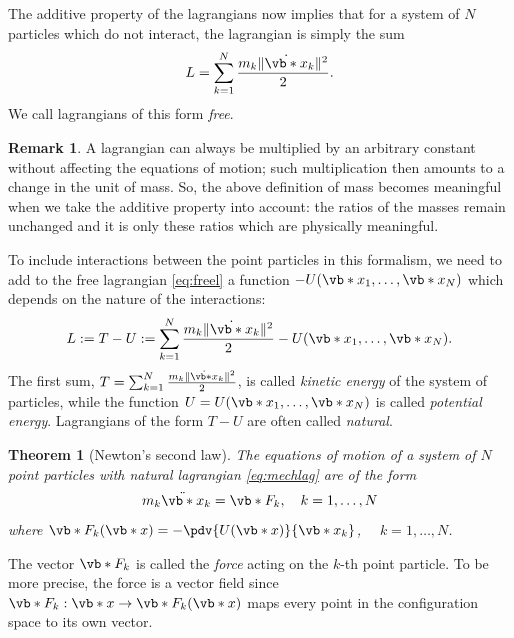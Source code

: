\documentclass[english,fontsize=11pt,paper=b5]{scrbook}
\numberwithin{equation}{chapter}
\newtheorem{theorem}{Theorem}[chapter]
\theoremstyle{definition}
\newtheorem{remark}{Remark}[chapter]
\newcommand{\emphidx}[1]{\index{#1}\emph{#1}}
\begin{document}
    The additive property of the lagrangians now implies that for a system of $N$ particles which do not interact, the lagrangian is simply the sum
    \begin{equation}\label{eq:freel}
      L = \sum_{k=1}^N \frac{m_k \|\dot{\vb*{x}}_k\|^2}{2}.
    \end{equation}
    We call lagrangians of this form \emph{free}.

    \begin{remark}
      A lagrangian can always be multiplied by an arbitrary constant without affecting the equations of motion;
      such multiplication then amounts to a change in the unit of mass.
      So, the above definition of mass becomes meaningful when we take the additive property into account:
      the ratios of the masses remain unchanged and it is only these ratios which are physically meaningful.
    \end{remark}

    To include interactions between the point particles in this formalism, we need to add to the free lagrangian \eqref{eq:freel} a function $-U(\vb*{x}_1, \ldots, \vb*{x}_N)$ which depends on the nature of the interactions:
    \begin{equation}\label{eq:mechlag}
      L := T-U := \sum_{k=1}^N \frac{m_k \|\dot{\vb*{x}}_k\|^2}{2} -U(\vb*{x}_1, \ldots, \vb*{x}_N).
    \end{equation}
    The first sum, $T = \sum_{k=1}^N \frac{m_k \|\dot{\vb*{x}}_k\|^2}{2}$, is called \emph{kinetic energy} of the system of particles, while the function $U = U(\vb*{x}_1, \ldots, \vb*{x}_N)$ is called \emph{potential energy}.
    Lagrangians of the form $T-U$ are often called \emph{natural}.

    \begin{theorem}[Newton's second law]
      The equations of motion of a system of $N$ point particles with natural lagrangian \eqref{eq:mechlag} are of the form
      \begin{equation}\label{eq:newton2}
        m_k \ddot{\vb*{x}}_k = \vb*{F}_k, \quad k=1,\ldots,N
      \end{equation}
      where $\vb*{F}_k (\vb*{x}) = -\pdv{U (\vb*{x})}{\vb*{x}_k}$, $\quad k=1,\ldots,N$.
    \end{theorem}

    The vector $\vb*{F}_k$ is called the \emphidx{force} acting on the $k$-th point particle. To be more precise, the force is a vector field since $\vb*{F}_k : \vb*{x} \to \vb*{F}_k(\vb*{x})$ maps every point in the configuration space to its own vector.
\end{document}
